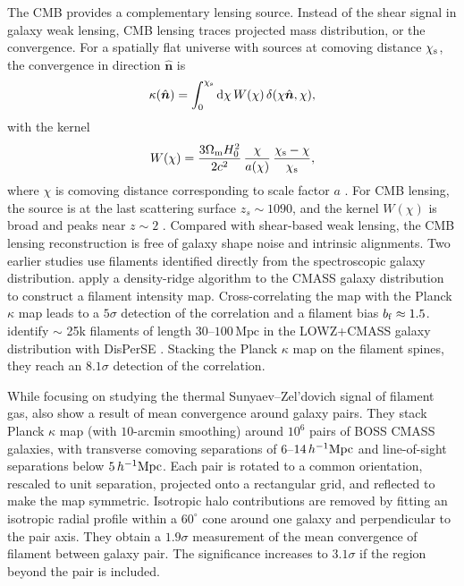 \documentclass[twocolumn,anonymous,linenumbers]{aastex701}
\newcommand{\hinvMpc}{h^{-1}{\rm Mpc}}
\begin{document}
The CMB provides a complementary lensing source. Instead of the shear signal in galaxy weak lensing, CMB lensing traces projected mass distribution, or the convergence. For a spatially flat universe with sources at comoving distance $\chi_{\rm s}$, the convergence in direction $\hat{\boldsymbol n}$ is
\begin{equation}
  \kappa(\hat{\boldsymbol n}) = \int_{0}^{\chi_{\rm s}} \mathrm{d}\chi\,
  W(\chi)\,\delta(\chi\hat{\boldsymbol n},\chi),
  \label{eq:kappa}
\end{equation}
with the kernel  
\begin{equation}  
W(\chi) = \frac{3\Omega_{\rm m}H_{0}^{2}}{2c^{2}}\,
  \frac{\chi}{a(\chi)}\,\frac{\chi_{\rm s}-\chi}{\chi_{\rm s}},
  \label{eq:kernel}
\end{equation}
where $\chi$ is comoving distance corresponding to scale factor $a$ 
\citep{Bartelmann2001}. For CMB lensing, the source is at the last scattering surface $z_s\sim 1090$, and the kernel $W(\chi)$ is broad and peaks near $z\sim2$ \citep{LewisChallinor2006}. 
Compared with shear-based weak lensing, the CMB lensing reconstruction is free of galaxy shape noise and intrinsic alignments. Two earlier studies use filaments identified directly from the spectroscopic galaxy distribution. \citet{He2018} apply a density-ridge algorithm to the CMASS galaxy distribution
to construct a filament intensity map. Cross-correlating the map with the Planck $\kappa$ map \citep{Planck2018lensing} leads to a $5\sigma$ detection of the correlation and a filament bias $b_{\rm f}\approx1.5$. \citet{Tanimura2020} identify $\sim$ 25k filaments of length $30$--$100\,\mathrm{Mpc}$ in the LOWZ+CMASS galaxy distribution with DisPerSE \citep{Sousbie2011}. Stacking the Planck $\kappa$ map on the filament spines, they reach an $8.1\sigma$ detection of the correlation. 

While focusing on studying the thermal Sunyaev–Zel’dovich signal \citep{SZ1980} of filament gas, \citet{deGraaff2019} also show a result of mean convergence around galaxy pairs. They stack Planck $\kappa$ map (with $10$-arcmin smoothing) around $10^6$ pairs of BOSS CMASS galaxies, with transverse comoving separations of $6$--$14\,\hinvMpc$ and line-of-sight separations below $5\,\hinvMpc$. Each pair is rotated to a common orientation, rescaled to unit separation, projected onto a rectangular grid, and reflected to make the map symmetric. Isotropic halo contributions are removed by fitting an isotropic radial profile within a $60^{\circ}$ cone around one galaxy and perpendicular to the pair axis. They obtain a $1.9\sigma$ measurement of the mean convergence of filament between galaxy pair. The significance increases to $3.1\sigma$ if the region beyond the pair is included.
\end{document}
